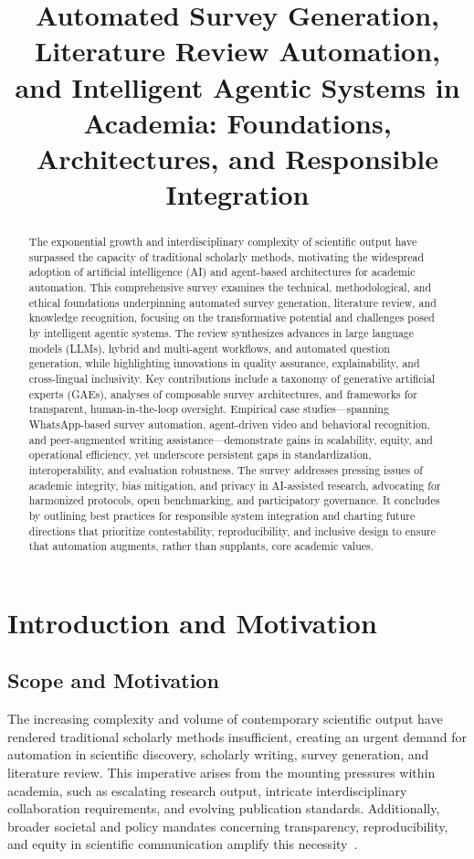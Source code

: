 \documentclass[sigconf]{acmart}
\title{Automated Survey Generation, Literature Review Automation, and Intelligent Agentic Systems in Academia: Foundations, Architectures, and Responsible Integration}
\begin{document}
\begin{abstract}
The exponential growth and interdisciplinary complexity of scientific output have surpassed the capacity of traditional scholarly methods, motivating the widespread adoption of artificial intelligence (AI) and agent-based architectures for academic automation. This comprehensive survey examines the technical, methodological, and ethical foundations underpinning automated survey generation, literature review, and knowledge recognition, focusing on the transformative potential and challenges posed by intelligent agentic systems. The review synthesizes advances in large language models (LLMs), hybrid and multi-agent workflows, and automated question generation, while highlighting innovations in quality assurance, explainability, and cross-lingual inclusivity. Key contributions include a taxonomy of generative artificial experts (GAEs), analyses of composable survey architectures, and frameworks for transparent, human-in-the-loop oversight. Empirical case studies—spanning WhatsApp-based survey automation, agent-driven video and behavioral recognition, and peer-augmented writing assistance—demonstrate gains in scalability, equity, and operational efficiency, yet underscore persistent gaps in standardization, interoperability, and evaluation robustness. The survey addresses pressing issues of academic integrity, bias mitigation, and privacy in AI-assisted research, advocating for harmonized protocols, open benchmarking, and participatory governance. It concludes by outlining best practices for responsible system integration and charting future directions that prioritize contestability, reproducibility, and inclusive design to ensure that automation augments, rather than supplants, core academic values.
\end{abstract}

\maketitle

\section{Introduction and Motivation}

\subsection{Scope and Motivation}

The increasing complexity and volume of contemporary scientific output have rendered traditional scholarly methods insufficient, creating an urgent demand for automation in scientific discovery, scholarly writing, survey generation, and literature review. This imperative arises from the mounting pressures within academia, such as escalating research output, intricate interdisciplinary collaboration requirements, and evolving publication standards. Additionally, broader societal and policy mandates concerning transparency, reproducibility, and equity in scientific communication amplify this necessity~\cite{ref106,ref111}. 
\end{document}
